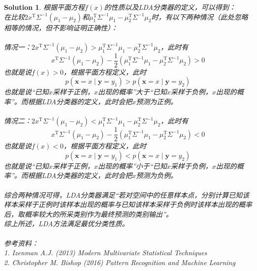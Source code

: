 \documentclass[a4paper,UTF8]{article}
\numberwithin{equation}{section}
\newtheorem*{solution}{Solution}
\begin{document}
\begin{solution}
根据平面方程$f(x)$的性质以及LDA分类器的定义，可以得到：\\
在比较$2x^{\mathrm{T}}\Sigma^{-1}(\mu_1 - \mu_2)$和$\mu_1^\mathrm{T}\Sigma^{-1}\mu_1 - \mu_2^\mathrm{T}\Sigma^{-1}\mu_2$时，有以下两种情况（此处忽略相等的情况，但不影响证明正确性）：\\\\
情况一：$2x^{\mathrm{T}}\Sigma^{-1}(\mu_1 - \mu_2) > \mu_1^\mathrm{T}\Sigma^{-1}\mu_1 - \mu_2^\mathrm{T}\Sigma^{-1}\mu_2$，此时有
\begin{equation}
	x^{\mathrm{T}}\Sigma^{-1}(\mu_1 - \mu_2) - \frac{1}{2}(\mu_1^\mathrm{T}\Sigma^{-1}\mu_1 - \mu_2^\mathrm{T}\Sigma^{-1}\mu_2) > 0
\end{equation}
也就是说$f(x) > 0$，根据平面方程定义，此时
\begin{equation}
p(\mathbf{x} = x \mid \mathbf{y} = y_1) > p(\mathbf{x} = x \mid \mathbf{y} = y_2)
\end{equation}
也就是说“已知$x$采样于正例，$x$出现的概率”大于“已知$x$采样于负例，$x$出现的概率”。而根据LDA分类器的定义，此时会把$x$预测为正例。\\\\
情况二：$2x^{\mathrm{T}}\Sigma^{-1}(\mu_1 - \mu_2) < \mu_1^\mathrm{T}\Sigma^{-1}\mu_1 - \mu_2^\mathrm{T}\Sigma^{-1}\mu_2$，此时有
\begin{equation}
x^{\mathrm{T}}\Sigma^{-1}(\mu_1 - \mu_2) - \frac{1}{2}(\mu_1^\mathrm{T}\Sigma^{-1}\mu_1 - \mu_2^\mathrm{T}\Sigma^{-1}\mu_2) < 0
\end{equation}
也就是说$f(x) < 0$，根据平面方程定义，此时
\begin{equation}
p(\mathbf{x} = x \mid \mathbf{y} = y_1) < p(\mathbf{x} = x \mid \mathbf{y} = y_2)
\end{equation}
也就是说“已知$x$采样于正例，$x$出现的概率”小于“已知$x$采样于负例，$x$出现的概率”。而根据LDA分类器的定义，此时会把$x$预测为负例。\\\\
综合两种情况可得，LDA分类器满足“若对空间中的任意样本点，分别计算已知该样本采样于正例时该样本出现的概率与已知该样本采样于负例时该样本出现的概率后，取概率较大的所采类别作为最终预测的类别输出”。\\
综上所述，LDA方法满足最优分类性质。\\\\
参考资料：\\
1. Izenman A.J. (2013) Modern Multivariate Statistical Techniques\\
2. Christopher M. Bishop (2016) Pattern Recognition and Machine Learning\\
\end{solution}
\newpage
\end{document}
